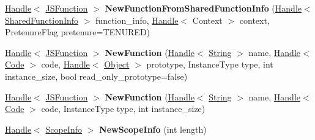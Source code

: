 \begin{DoxyCompactItemize}
\item 
\hypertarget{classv8_1_1internal_1_1_v8___f_i_n_a_l_a73ee59b0da5f99b0687bebf0deb86ffd}{}\hyperlink{classv8_1_1internal_1_1_handle}{Handle}$<$ \hyperlink{classv8_1_1internal_1_1_j_s_function}{J\+S\+Function} $>$ {\bfseries New\+Function\+From\+Shared\+Function\+Info} (\hyperlink{classv8_1_1internal_1_1_handle}{Handle}$<$ \hyperlink{classv8_1_1internal_1_1_shared_function_info}{Shared\+Function\+Info} $>$ function\+\_\+info, \hyperlink{classv8_1_1internal_1_1_handle}{Handle}$<$ Context $>$ context, Pretenure\+Flag pretenure=T\+E\+N\+U\+R\+E\+D)\label{classv8_1_1internal_1_1_v8___f_i_n_a_l_a73ee59b0da5f99b0687bebf0deb86ffd}

\item 
\hypertarget{classv8_1_1internal_1_1_v8___f_i_n_a_l_adc2635d1e4d7ea84cd870445c53be359}{}\hyperlink{classv8_1_1internal_1_1_handle}{Handle}$<$ \hyperlink{classv8_1_1internal_1_1_j_s_function}{J\+S\+Function} $>$ {\bfseries New\+Function} (\hyperlink{classv8_1_1internal_1_1_handle}{Handle}$<$ \hyperlink{classv8_1_1internal_1_1_string}{String} $>$ name, \hyperlink{classv8_1_1internal_1_1_handle}{Handle}$<$ \hyperlink{classv8_1_1internal_1_1_code}{Code} $>$ code, \hyperlink{classv8_1_1internal_1_1_handle}{Handle}$<$ \hyperlink{classv8_1_1internal_1_1_object}{Object} $>$ prototype, Instance\+Type type, int instance\+\_\+size, bool read\+\_\+only\+\_\+prototype=false)\label{classv8_1_1internal_1_1_v8___f_i_n_a_l_adc2635d1e4d7ea84cd870445c53be359}

\item 
\hypertarget{classv8_1_1internal_1_1_v8___f_i_n_a_l_a1e1c19b21329375e08498d42d921f241}{}\hyperlink{classv8_1_1internal_1_1_handle}{Handle}$<$ \hyperlink{classv8_1_1internal_1_1_j_s_function}{J\+S\+Function} $>$ {\bfseries New\+Function} (\hyperlink{classv8_1_1internal_1_1_handle}{Handle}$<$ \hyperlink{classv8_1_1internal_1_1_string}{String} $>$ name, \hyperlink{classv8_1_1internal_1_1_handle}{Handle}$<$ \hyperlink{classv8_1_1internal_1_1_code}{Code} $>$ code, Instance\+Type type, int instance\+\_\+size)\label{classv8_1_1internal_1_1_v8___f_i_n_a_l_a1e1c19b21329375e08498d42d921f241}

\item 
\hypertarget{classv8_1_1internal_1_1_v8___f_i_n_a_l_abe1cdedc24e367f3288ec6d1974767b0}{}\hyperlink{classv8_1_1internal_1_1_handle}{Handle}$<$ \hyperlink{classv8_1_1internal_1_1_scope_info}{Scope\+Info} $>$ {\bfseries New\+Scope\+Info} (int length)\label{classv8_1_1internal_1_1_v8___f_i_n_a_l_abe1cdedc24e367f3288ec6d1974767b0}


\end{DoxyCompactItemize}
